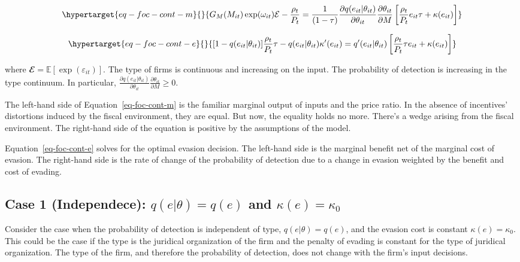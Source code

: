 \documentclass[
  12pt]{article}
\begin{document}
\begin{equation}\protect\hypertarget{eq-foc-cont-m}{}{
G_M(M_{it})\exp(\omega_{it})\mathcal{E}-\frac{\rho_{t}}{P_t} = \frac{1}{(1-\tau)}\frac{\partial q(e_{it}|\theta_{it})}{\partial \theta_{it}}\frac{\partial \theta_{it}}{\partial M}\left[\frac{\rho_t}{P_t}e_{it}\tau+\kappa(e_{it})\right]
}\label{eq-foc-cont-m}\end{equation}

\begin{equation}\protect\hypertarget{eq-foc-cont-e}{}{
[1-q(e_{it}|\theta_{it})]\frac{\rho_t}{P_t}\tau-q(e_{it}|\theta_{it})\kappa'(e_{it})=q'(e_{it}|\theta_{it})\left[\frac{\rho_t}{P_t}\tau e_{it} + \kappa(e_{it})\right]
}\label{eq-foc-cont-e}\end{equation}

where \(\mathbfcal{E}=\mathbb{E}[\exp(\varepsilon_{it})]\). The type of
firms is continuous and increasing on the input. The probability of
detection is increasing in the type continuum. In particular,
\(\frac{\partial q(e_{it}|\theta_{it})}{\partial \theta_{it}}\frac{\partial \theta_{it}}{\partial M}\ge0\).

The left-hand side of Equation~\ref{eq-foc-cont-m} is the familiar
marginal output of inputs and the price ratio. In the absence of
incentives' distortions induced by the fiscal environment, they are
equal. But now, the equality holds no more. There's a wedge arising from
the fiscal environment. The right-hand side of the equation is positive
by the assumptions of the model.

Equation~\ref{eq-foc-cont-e} solves for the optimal evasion decision.
The left-hand side is the marginal benefit net of the marginal cost of
evasion. The right-hand side is the rate of change of the probability of
detection due to a change in evasion weighted by the benefit and cost of
evading.

\hypertarget{case-1-independece-qethetaqe-and-kappaekappa_0}{%
\subsection{\texorpdfstring{Case 1 (Independece): \(q(e|\theta)=q(e)\)
and
\(\kappa(e)=\kappa_0\)}{Case 1 (Independece): q(e\textbar\textbackslash theta)=q(e) and \textbackslash kappa(e)=\textbackslash kappa\_0}}\label{case-1-independece-qethetaqe-and-kappaekappa_0}}

Consider the case when the probability of detection is independent of
type, \(q(e|\theta)=q(e)\), and the evasion cost is constant
\(\kappa(e)=\kappa_0\). This could be the case if the type is the
juridical organization of the firm and the penalty of evading is
constant for the type of juridical organization. The type of the firm,
and therefore the probability of detection, does not change with the
firm's input decisions.
\end{document}
